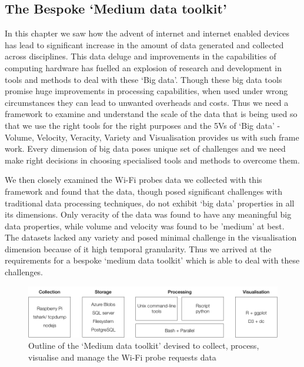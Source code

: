 
\subsection{The Bespoke `Medium data toolkit'}

In this chapter we saw how the advent of internet and internet enabled devices has lead to significant increase in the amount of data generated and collected across disciplines. 
This data deluge and improvements in the capabilities of computing hardware has fuelled an explosion of research and development in tools and methods to deal with these `Big data'.
Though these big data tools promise huge improvements in processing capabilities, when used under wrong circumstances they can lead to unwanted overheads and costs.
Thus we need a framework to examine and understand the scale of the data that is being used so that we use the right tools for the right purposes and the 5Vs of `Big data' - Volume, Velocity, Veracity, Variety and Visualisation provides us with such frame work.
Every dimension of big data poses unique set of challenges and we need make right decisions in choosing specialised tools and methods to overcome them.

We then closely examined the Wi-Fi probes data we collected with this framework and found that the data, though posed significant challenges with traditional data processing techniques, do not exhibit `big data' properties in all its dimensions. 
Only veracity of the data was found to have any meaningful big data properties, while volume and velocity was found to be 'medium' at best. 
The datasets lacked any variety and posed minimal challenge in the visualisation dimension because of it high temporal granularity.
Thus we arrived at the requirements for a bespoke `medium data toolkit' which is able to deal with these challenges.

\begin{figure}
  \includegraphics{images/toolkit.png}
  \caption{Outline of the `Medium data toolkit' devised to collect, process, visualise and manage the Wi-Fi probe requests data}
  \label{figure:toolkit}
\end{figure}

